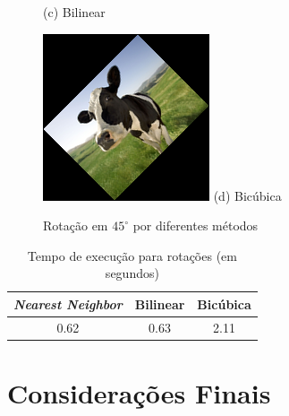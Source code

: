 \documentclass[12pt]{article}
\begin{document}
\begin{figure}[H]
\begin{minipage}{.45\textwidth}
        (c) Bilinear
    \end{minipage}%
    \begin{minipage}{.45\textwidth}
        \centering
        \includegraphics{cow_cubic_rotated}
        (d) Bicúbica
    \end{minipage}
    \caption{Rotação em $45^{\circ}$ por diferentes métodos}
    \label{fig:vaca:rotacao}
\end{figure}

\begin{table}[H]
\centering
\begin{tabular}{c|c|c}
 \textit{Nearest Neighbor} & Bilinear & Bicúbica  \\
 \hline
 0.62 & 0.63 & 2.11
\end{tabular}
\caption{Tempo de execução para rotações (em segundos)}
\label{tab:rotacoes}
\end{table}

\section{Considerações Finais}

\printbibliography
\end{document}
